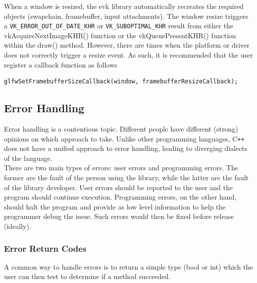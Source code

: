 \documentclass[12pt]{report}
\newcommand{\cpp}{C\texttt{++}}
\theoremstyle{definition}
\begin{document}
          When a window is resized, the evk library automatically recreates the
          required objects (swapchain, framebuffer, input attachments). The
          window resize triggers a \verb|VK_ERROR_OUT_OF_DATE_KHR| or \verb|VK_SUBOPTIMAL_KHR|
          result from either the vkAcquireNextImageKHR() function or the
          vkQueuePresentKHR() function within the draw() method. However,
          there are times when the platform or driver does not correctly
          trigger a resize event. As such, it is recommended that the user register
          a callback function as follows

        \begin{centering}
          \begin{Verbatim}[fontsize=\small]
glfwSetFramebufferSizeCallback(window, framebufferResizeCallback);
          \end{Verbatim}
        \end{centering}

      \subsection{Error Handling}

        Error handling is a contentious topic. Different people have different
        (strong) opinions on which approach to take. Unlike other programming
        languages, \cpp{} does not have a unified approach to error handling,
        leading to diverging dialects of the language. \\

        There are two main types of errors: user errors and programming errors.
        The former are the fault of the person using the library, while the
        latter are the fault of the library developer. User errors should be
        reported to the user and the program should continue execution.
        Programming errors, on the other hand, should halt the program and
        provide as low level information to help the programmer debug the
        issue. Such errors would then be fixed before release (ideally). \\

        \subsubsection{Error Return Codes}

          A common way to handle errors is to return a simple type (bool or int)
          which the user can then test to determine if a method succeeded.
\end{document}
